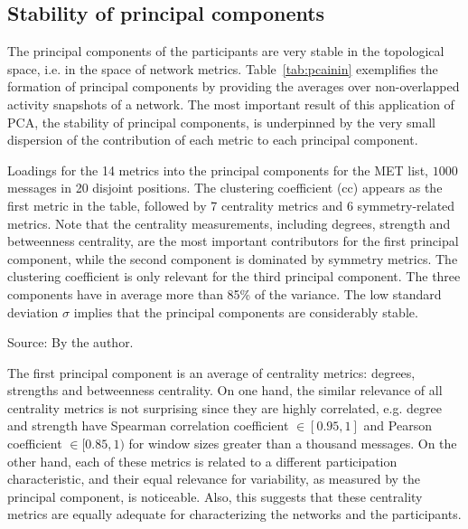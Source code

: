 \subsection{Stability of principal components}\label{prevalence}

The principal components of the participants are very stable in the topological space,
i.e. in the space of network metrics.
Table~\ref{tab:pcainin} exemplifies the formation of principal components by providing the averages over non-overlapped activity snapshots of a network. The most important result of this application of PCA, the stability of principal components, is underpinned by the very small dispersion of the contribution of each metric to each principal component.

\begin{table}[!h]
\caption{Loadings for the 14 metrics into the principal components for the MET list, $1000$ messages in 20 disjoint positions. The clustering coefficient (cc) appears as the first metric in the table, followed by 7 centrality metrics and 6 symmetry-related metrics. Note that the centrality measurements, including degrees, strength and betweenness centrality, are the most important contributors for the first principal component, while the second component is dominated by symmetry metrics. The clustering coefficient is only relevant for the third principal component. The three components have in average more than 85\% of the variance.
The low standard deviation $\sigma$ implies that the principal components are considerably stable.}
\footnotesize

\label{tab:pcainin}
\begin{flushleft}\footnotesize
Source: By the author.\
\end{flushleft}
\end{table}

The first principal component is an average of centrality metrics:
degrees, strengths and betweenness centrality.
On one hand, the similar relevance of all centrality metrics is not surprising since they are highly correlated,
e.g. degree and strength have Spearman correlation coefficient $\in [0.95,1]$ 
and Pearson coefficient $\in [0.85,1)$ for window sizes greater than a thousand messages.
On the other hand, each of these metrics is related to a different participation characteristic,
and their equal relevance for variability,
as measured by the principal component, is noticeable.
Also, this suggests that these centrality metrics 
are equally adequate for characterizing the networks
and the participants.

